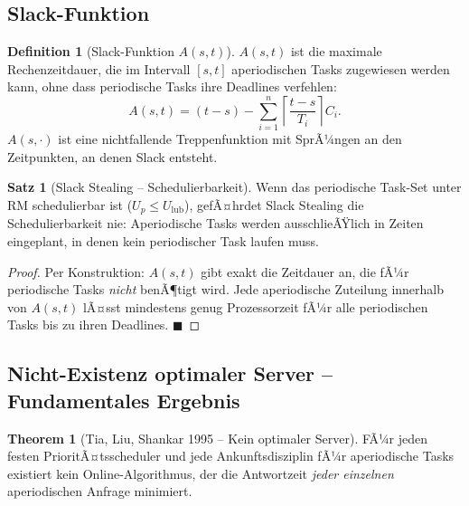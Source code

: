 ﻿\documentclass[a4paper,12pt]{report}
\theoremstyle{definition}
\newtheorem{definition}{Definition}[chapter]
\newtheorem{satz}{Satz}[chapter]
\newtheorem{theorem}{Theorem}[chapter]
\begin{document}
\subsection{Slack-Funktion}

\begin{definition}[Slack-Funktion $A(s,t)$]
	$A(s, t)$ ist die maximale Rechenzeitdauer, die im Intervall $[s, t]$
	aperiodischen Tasks zugewiesen werden kann, ohne dass periodische Tasks
	ihre Deadlines verfehlen:
	\[
		A(s, t) = (t-s) - \sum_{i=1}^n \left\lceil \frac{t-s}{T_i} \right\rceil C_i.
	\]
	$A(s, \cdot)$ ist eine nichtfallende Treppenfunktion mit SprÃ¼ngen an den
	Zeitpunkten, an denen Slack entsteht.
\end{definition}

\begin{satz}[Slack Stealing -- Schedulierbarkeit]
	Wenn das periodische Task-Set unter RM schedulierbar ist ($U_p \leq U_{\text{lub}}$),
	gefÃ¤hrdet Slack Stealing die Schedulierbarkeit nie: Aperiodische Tasks werden
	ausschlieÃŸlich in Zeiten eingeplant, in denen kein periodischer Task laufen muss.
\end{satz}

\begin{proof}
	Per Konstruktion: $A(s, t)$ gibt exakt die Zeitdauer an, die fÃ¼r periodische
	Tasks \emph{nicht} benÃ¶tigt wird. Jede aperiodische Zuteilung innerhalb von
	$A(s, t)$ lÃ¤sst mindestens genug Prozessorzeit fÃ¼r alle periodischen Tasks
	bis zu ihren Deadlines. \hfill$\blacksquare$
\end{proof}

\subsection{Nicht-Existenz optimaler Server -- Fundamentales Ergebnis}

\begin{theorem}[Tia, Liu, Shankar 1995 -- Kein optimaler Server]
	\label{thm:nooptserver}
	FÃ¼r jeden festen PrioritÃ¤tsscheduler und jede Ankunftsdisziplin fÃ¼r
	aperiodische Tasks existiert kein Online-Algorithmus, der die Antwortzeit
	\emph{jeder einzelnen} aperiodischen Anfrage minimiert.
\end{theorem}
\end{document}
